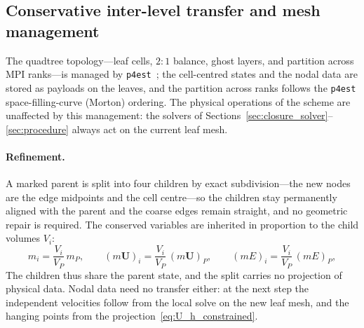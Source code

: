 \documentclass[a4paper]{cas-sc}
\begin{document}






\subsection{Conservative inter-level transfer and mesh management}
\label{sec:transfer}

The quadtree topology---leaf cells, $2\!:\!1$ balance, ghost layers, and partition across MPI ranks---is managed by \texttt{p4est}~\cite{burstedde2011p4est}; the cell-centred states and the nodal data are stored as payloads on the leaves, and the partition across ranks follows the \texttt{p4est} space-filling-curve (Morton) ordering. The physical operations of the scheme are unaffected by this management: the solvers of Sections~\ref{sec:closure_solver}--\ref{sec:procedure} always act on the current leaf mesh.

\paragraph{Refinement.}
A marked parent is split into four children by exact subdivision---the new nodes are the edge midpoints and the cell centre---so the children stay permanently aligned with the parent and the coarse edges remain straight, and no geometric repair is required. The conserved variables are inherited in proportion to the child volumes $V_i$:
\begin{equation}
	m_i=\frac{V_i}{V_P}\,m_P,\qquad
	(m\boldsymbol U)_i=\frac{V_i}{V_P}\,(m\boldsymbol U)_P,\qquad
	(mE)_i=\frac{V_i}{V_P}\,(mE)_P,
	\label{eq:refine_transfer}
\end{equation}
The children thus share the parent state, and the split carries no projection of physical data. Nodal data need no transfer either: at the next step the independent velocities follow from the local solve on the new leaf mesh, and the hanging points from the projection~\eqref{eq:U_h_constrained}.
\end{document}
